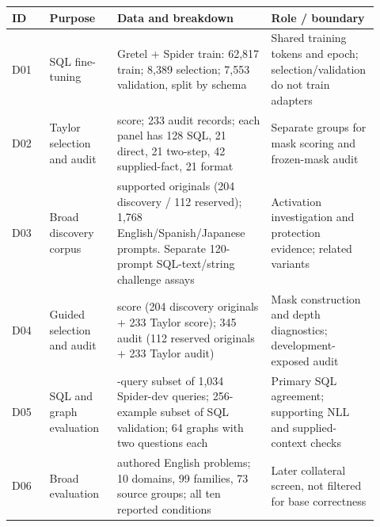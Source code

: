 \documentclass[10pt,letterpaper]{article}
\newcommand{\datasetentry}[1]{\hypertarget{dataset-#1}{\textnormal{#1}}}
\begin{document}
\begin{center}
\begin{minipage}{\linewidth}
\makeatletter{}\makeatother
\centering
\small
\caption{Data by major purpose. Each purpose has one dataset ID linking to its row in this
table throughout the paper. Panels overlap their parent pools;
counts are not independent samples to be summed.}
\label{tab:datasets}
\setlength{\tabcolsep}{4pt}
\begin{tabular}{@{}>{\raggedright\arraybackslash}p{0.10\linewidth}
>{\raggedright\arraybackslash}p{0.18\linewidth}
>{\raggedright\arraybackslash}p{0.41\linewidth}
>{\raggedright\arraybackslash}p{0.23\linewidth}@{}}
\toprule
ID & Purpose & Data and breakdown & Role / boundary\\
\midrule
\datasetentry{D01} &
SQL fine-tuning &
Gretel + Spider train: 62,817 train; 8,389 selection;
7,553 validation, split by schema &
Shared training tokens and epoch; selection/validation do not train adapters\\
\addlinespace
\datasetentry{D02} &
Taylor selection and audit &
233 score; 233 audit records; each panel has 128 SQL,
21 direct, 21 two-step, 42 supplied-fact, 21 format &
Separate groups for mask scoring and frozen-mask audit\\
\addlinespace
\datasetentry{D03} &
Broad discovery corpus &
316 supported originals (204 discovery / 112 reserved);
1,768 English/Spanish/Japanese prompts.
Separate 120-prompt SQL-text/string challenge assays &
Activation investigation and protection evidence; related variants\\
\addlinespace
\datasetentry{D04} &
Guided selection and audit &
437 score (204 discovery originals + 233 Taylor score);
345 audit (112 reserved originals + 233 Taylor audit) &
Mask construction and depth diagnostics; development-exposed audit\\
\addlinespace
\datasetentry{D05} &
SQL and graph evaluation &
128-query subset of 1,034 Spider-dev queries;
256-example subset of SQL validation;
64 graphs with two questions each &
Primary SQL agreement; supporting NLL and supplied-context checks\\
\addlinespace
\datasetentry{D06} &
Broad evaluation &
120 authored English problems; 10 domains,
99 families, 73 source groups; all ten reported conditions &
Later collateral screen, not filtered for base correctness\\
\bottomrule
\end{tabular}
\end{minipage}
\end{center}
\end{document}
